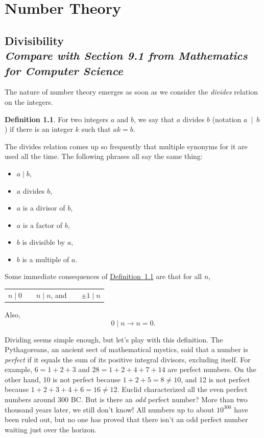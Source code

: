 \documentclass[11pt,oneside]{book}
\theoremstyle{definition}
\newtheorem{defn}[thm]{Definition}
\begin{document}
\chapter{Number Theory}
\section[Divisibility]{Divisibility\\[0.5ex]
\normalsize\normalfont\textit{
    Compare with Section 9.1 from \emph{Mathematics for Computer Science}
}}
The nature of number theory emerges as soon as we consider the \emph{divides} relation on the integers.
\begin{defn} \label{defn:divides}
    For two integers $a$ and $b$, we say that $a$ divides $b$ (notation $a \ \mid \ b$) if there is an integer $k$ such that $ak = b$.
\end{defn}
The divides relation comes up so frequently that multiple synonyms for it are used all the time.
The following phrases all say the same thing:
\begin{itemize}
\item $a \mid b$,
\item $a$ divides $b$,
\item $a$ is a divisor of $b$,
\item $a$ is a factor of $b$,
\item $b$ is divisible by $a$,
\item $b$ is a multiple of $a$.
\end{itemize}
Some immediate consequences of \hyperref[defn:divides]{Definition~\ref*{defn:divides}} are that for all $n$,
\begin{center}\begin{tabular}{ccccc}
    $n \mid 0$ & \quad & $n \mid n$, and & \quad & $\pm 1 \mid n$
\end{tabular}\end{center}
Also,
\[ 0 \mid n \rightarrow n = 0. \]

Dividing seems simple enough, but let’s play with this definition.
The Pythagoreans, an ancient sect of mathematical mystics, said that a number is \emph{perfect} if it equals the sum of its positive integral divisors, excluding itself.
For example, $6 = 1 + 2 + 3$ and $28 = 1 + 2 + 4 + 7 + 14$ are perfect numbers.
On the other hand, 10 is not perfect because $1 + 2 + 5 = 8 \neq 10$, and 12 is not perfect because $1 + 2 + 3 + 4 + 6 = 16 \neq 12$. Euclid characterized all the even perfect numbers around 300 BC.
But is there an \emph{odd} perfect number? More than two thousand years later, we still don't know!
All numbers up to about $10^{300}$ have been
ruled out, but no one has proved that there isn't an odd perfect number waiting just over the horizon.
\end{document}
